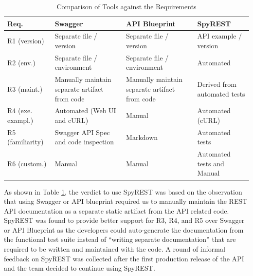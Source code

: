 \begin{table}[!tbh]
\caption{Comparison of Tools against the Requirements}
  \label{table:compare}
  \begin{tabular}{|p{1in} | p{1.5in}| p{1.7in}|p{1.5in}|}

\hline
\textbf{Req}. & \textbf{Swagger} & \textbf{API Blueprint} & \textbf{SpyREST} \\
\hline
R1 (version) & Separate file / version & Separate file / version & API example / version \\
\hline
R2 (env.)& Separate file / environment & Separate file / environment & Automated \\
\hline
R3 (maint.)& Manually maintain separate artifact from code & Manually maintain separate artifact from code & Derived from automated tests \\
\hline
R4 (exe. exampl.)& Automated (Web UI and cURL) & Manual & Automated (cURL) \\
\hline
R5 (familiarity)& Swagger API Spec and code inspection & Markdown & Automated tests \\
\hline
R6 (custom.)& Manual & Manual & Automated tests and Manual \\
\hline
\end{tabular}
\end{table}

As shown in Table \ref{table:compare}, the verdict to use SpyREST was based on the observation that using Swagger or API blueprint required us to manually maintain the REST API documentation as a separate static artifact from the API related code. SpyREST was found to provide better support for R3, R4, and R5 over Swagger or API Blueprint as the developers could auto-generate the documentation from the functional test suite instead of ``writing separate documentation'' that are required to be written and maintained with the code. A round of informal feedback on SpyREST was collected after the first production release of the API and the team decided to continue using SpyREST.

